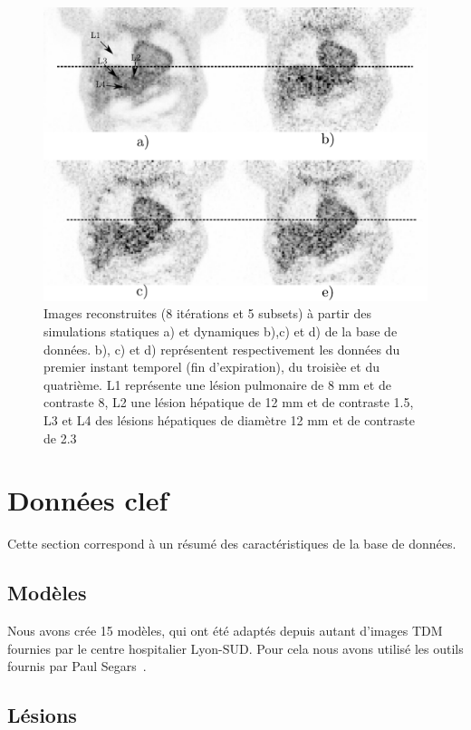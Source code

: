 \begin{figure}
 \centering
 \includegraphics[width=14cm]{images/exempleImageReconMouvement}
 \caption[Images respirantes reconstruites tirées de la base de donnée]{Images reconstruites (8 itérations et 5 subsets) à partir des simulations statiques a) et dynamiques b),c) et d) de la base de données. b), c) et d) représentent respectivement les données du premier instant temporel (fin d'expiration), du troisièe et du quatrième. L1 représente une lésion pulmonaire de 8 mm et de contraste 8, L2 une lésion hépatique de 12 mm et de contraste 1.5, L3 et L4 des lésions hépatiques de diamètre 12 mm et de contraste de 2.3}
 \label{fig:exempleImageReconMvt}
\end{figure}

\section{Données clef} %

Cette section correspond à un résumé des caractéristiques de la base de données.

\subsection{Modèles}

Nous avons crée 15 modèles, qui ont été adaptés depuis autant d'images TDM fournies par le centre hospitalier Lyon-SUD. Pour cela nous avons utilisé les outils fournis par Paul Segars~\cite{segars2001These}.


\subsection{Lésions}

